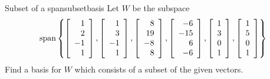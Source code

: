 \begin{example}{Subset of a span}{subsetbasis}
Let $W$ be the subspace 
\begin{equation*}
\mbox{span}\left\{ \left[ 
\begin{array}{r}
1 \\ 
2 \\ 
-1 \\ 
1
\end{array}
\right] ,\left[ 
\begin{array}{r}
1 \\ 
3 \\ 
-1 \\ 
1
\end{array}
\right] ,\left[ 
\begin{array}{r}
8 \\ 
19 \\ 
-8 \\ 
8
\end{array}
\right] ,\left[ 
\begin{array}{r}
-6 \\ 
-15 \\ 
6 \\ 
-6
\end{array}
\right] ,\left[ 
\begin{array}{r}
1 \\ 
3 \\ 
0 \\ 
1
\end{array}
\right] ,\left[ 
\begin{array}{r}
1 \\ 
5 \\ 
0 \\ 
1
\end{array}
\right] \right\}
\end{equation*}
Find a basis for $W$ which consists of a subset of the given vectors.
\end{example}

